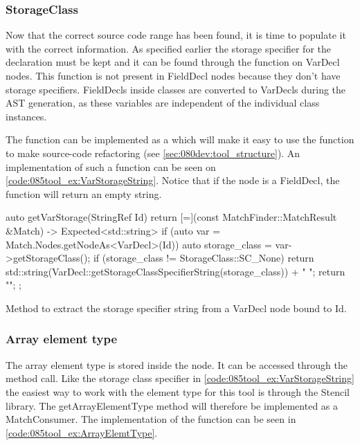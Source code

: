 \subsubsection*{StorageClass}
Now that the correct source code range has been found, it is time to populate it with the correct information. As specified earlier the storage specifier for the declaration must be kept and it can be found through the  function on VarDecl nodes. This function is not present in FieldDecl nodes because they don't have storage specifiers.  FieldDecls inside classes are converted to VarDecls during the AST generation, as these variables are independent of the individual class instances. 

The  function can be implemented as a  which will make it easy to use the function to make source-code refactoring (see \cref{sec:080dev:tool_structure}). An implementation of such a function can be seen on \cref{code:085tool_ex:VarStorageString}.
Notice that if the node is a FieldDecl, the function will return an empty string.

\begin{listing}[H]
    \begin{cppcode}
auto getVarStorage(StringRef Id) {
    return [=](const MatchFinder::MatchResult &Match) -> Expected<std::string> {
        if (auto var = Match.Nodes.getNodeAs<VarDecl>(Id)) {
            auto storage_class = var->getStorageClass();
            if (storage_class != StorageClass::SC_None) {
               return std::string(VarDecl::getStorageClassSpecifierString(storage_class)) + " ";
            }
        }
        return "";
    };
}
    \end{cppcode}
    \caption{Method to extract the storage specifier string from a VarDecl node bound to Id.}
    \label{code:085tool_ex:VarStorageString}
\end{listing}

\subsubsection*{Array element type}

The array element type is stored inside the  node. It can be accessed through the  method call. Like the storage class specifier in \cref{code:085tool_ex:VarStorageString} the easiest way to work with the element type for this tool is through the Stencil library. The getArrayElementType method will therefore be implemented as a MatchConsumer. The implementation of the function can be seen in \cref{code:085tool_ex:ArrayElemtType}. 

